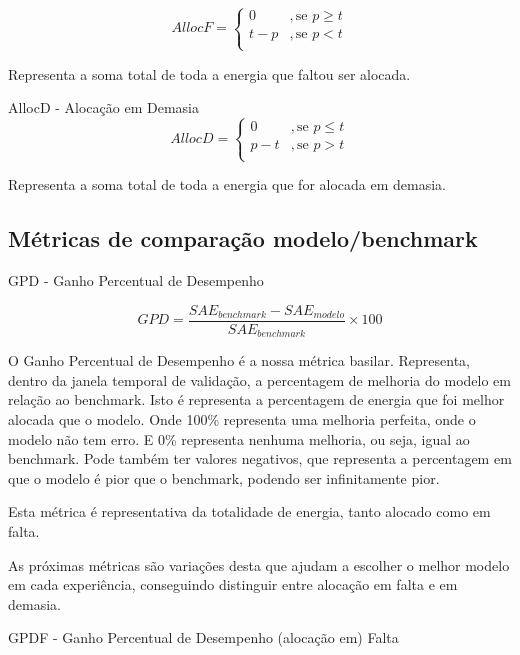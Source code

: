 \begin{equation} \label{eq:allocf} 
    AllocF = 
    \begin{cases} 
        0 & , \text{se } p \geq t \\
        t - p  & , \text{se } p < t \\
    \end{cases} 
\end{equation}
\smallskip

Representa a soma total de toda a energia que faltou ser alocada.\par
\bigskip
AllocD - Alocação em Demasia \\

\begin{equation} \label{eq:allocd} 
    AllocD = 
    \begin{cases} 
        0 & , \text{se } p \leq t \\
        p - t  & , \text{se } p > t \\
    \end{cases} 
\end{equation}
\smallskip

Representa a soma total de toda a energia que for alocada em demasia.\par

\subsection{Métricas de comparação modelo/benchmark}

GPD - Ganho Percentual de Desempenho

\begin{equation} \label{eq:gpd} 
    GPD = \frac{SAE_{benchmark} - SAE_{modelo}}{SAE_{benchmark}} \times 100
\end{equation}
\smallskip

O Ganho Percentual de Desempenho é a nossa métrica basilar. Representa, dentro da janela temporal de validação, a percentagem de melhoria do modelo em relação ao benchmark. Isto é representa a percentagem de energia que foi melhor alocada que o modelo. Onde 100\% representa uma melhoria perfeita, onde o modelo não tem erro. E 0\% representa nenhuma melhoria, ou seja, igual ao benchmark. Pode também ter valores negativos, que representa a percentagem em que o modelo é pior que o benchmark, podendo ser infinitamente pior.\par
Esta métrica é representativa da totalidade de energia, tanto alocado como em falta.\par
As próximas métricas são variações desta que ajudam a escolher o melhor modelo em cada experiência, conseguindo distinguir entre alocação em falta e em demasia.\par
\bigskip
GPDF - Ganho Percentual de Desempenho (alocação em) Falta\\

